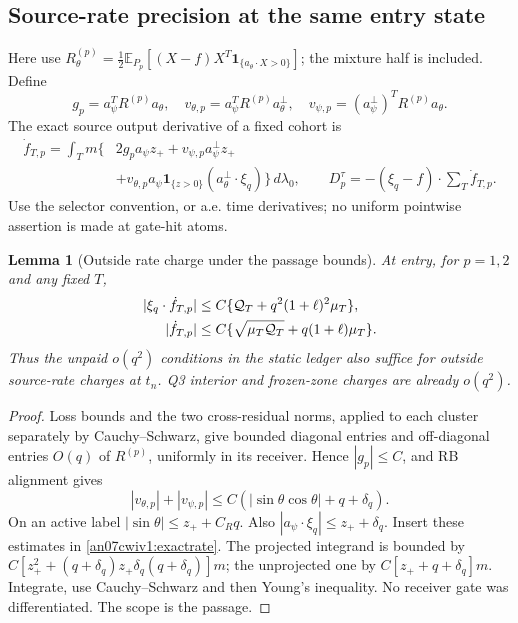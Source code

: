 \documentclass[11pt]{article}
\numberwithin{equation}{section}
\newtheorem{lemma}[theorem]{Lemma}
\theoremstyle{remark}\newtheorem{remark}[theorem]{Remark}
\newcommand{\E}{\mathbb E}\newcommand{\dd}{\,d}
\newcommand{\one}{\mathbf1}\newcommand{\eps}{\varepsilon}
\begin{document}
\subsection{Source-rate precision at the same entry state}
\label{an07cwiv1:rates}
Here use
\(R^{(p)}_\theta=\frac12\E_{P_p}[(X-f)X^T
\one_{\{a_\theta\cdot X>0\}}]\); the mixture half is included.
Define
\[
 g_p=a_\psi^TR^{(p)}a_\theta,\quad
 v_{\theta,p}=a_\psi^TR^{(p)}a_\theta^\perp,\quad
 v_{\psi,p}=(a_\psi^\perp)^TR^{(p)}a_\theta .
 \]
The exact source output derivative of a fixed cohort is
\begin{equation}
 \begin{split}
 \dot f_{T,p}=\int_Tm\{&
 2g_p a_\psi z_+
 +v_{\psi,p}a_\psi^\perp z_+\\
 &+v_{\theta,p}a_\psi\one_{\{z>0\}}
                       (a_\theta^\perp\cdot\xi_q)\}\dd\lambda_0,\qquad
 D_p^\tau=-(\xi_q-f)\cdot\sum_T\dot f_{T,p}.
 \end{split}
 \label{an07cwiv1:exactrate}
\end{equation}
Use the selector convention, or a.e. time derivatives; no
uniform pointwise assertion is made at gate-hit atoms.

\begin{lemma}[Outside rate charge under the passage bounds]
\label{an07cwiv1:ratecharge}
At entry, for \(p=1,2\) and any fixed \(T\),
\begin{align}
 |\xi_q\cdot\dot f_{T,p}|
 &\le C\{\mathcal Q_T+q^2(1+\ell)^2\mu_T\},\notag\\
 |\dot f_{T,p}|
 &\le C\{\sqrt{\mu_T\mathcal Q_T}+q(1+\ell)\mu_T\}.
 \label{an07cwiv1:ratechargeeq}
\end{align}
Thus the unpaid \(o(q^2)\) conditions in the static ledger
also suffice for outside source-rate charges at \(t_n\).
Q3 interior and frozen-zone charges are already \(o(q^2)\).
\end{lemma}
\begin{proof}
Loss bounds and the two cross-residual norms, applied to each
cluster separately by Cauchy--Schwarz, give bounded diagonal
entries and off-diagonal entries \(O(q)\) of \(R^{(p)}\),
uniformly in its receiver. Hence \(|g_p|\le C\), and RB
alignment gives
\[
 |v_{\theta,p}|+|v_{\psi,p}|
       \le C(|\sin\theta\cos\theta|+q+\delta_q).
 \]
On an active label \(|\sin\theta|\le z_++C_Rq\).
Also \(|a_\psi\cdot\xi_q|\le z_++\delta_q\).
Insert these estimates in \eqref{an07cwiv1:exactrate}.
The projected integrand is bounded by
\(C[z_+^2+(q+\delta_q)z_+
                         \delta_q(q+\delta_q)]m\);
the unprojected one by \(C[z_++q+\delta_q]m\).
Integrate, use Cauchy--Schwarz and then Young's inequality.
No receiver gate was differentiated. The scope is the passage.
\end{proof}
\end{document}
